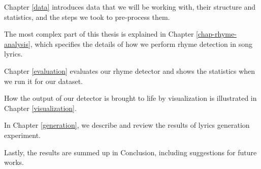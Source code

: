 Chapter \ref{data} introduces data that we will be working with, their structure and statistics, and the steps we took to pre-process them.

The most complex part of this thesis is explained in Chapter \ref{chap-rhyme-analysis}, which specifies the details of how we perform rhyme detection in song lyrics.

Chapter \ref{evaluation} evaluates our rhyme detector and shows the statistics when we run it for our dataset.

How the output of our detector is brought to life by visualization is illustrated in Chapter \ref{visualization}.

In Chapter \ref{generation}, we describe and review the results of lyrics generation experiment.

Lastly, the results are summed up in Conclusion, including suggestions for future works.